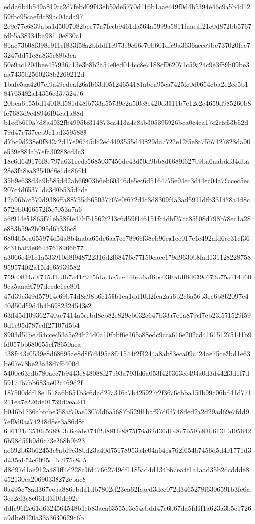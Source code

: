 {edda6b4b549a819cc2d7febd09f43eb59de5770d116b1aae449f0d4b5394e46c9a5b4d1259fbc95caefdc89ac04cda97
2e9e77c6839aba1d5007082bcc77a7fccb9461da564a5999a5811faaedf21c0d872bb5767fdb5a38334ba98110e830c1
81ac73b08f398e911cf833f58a2bfddf1e973e9c66c70b601dfc9a3636aeec9bc737020fec73247dd71e8a835e88b3ca
50e9ac1204bee457936713e3b8b2a54e0ed014cc8e7188cf962071c59a24c9e3f89b09be3aa7435b2560238b2269212d
1bafe5aa4207cf9a49edeaf26afb63d05124654181abea95ea7425fc0d0654cba2d2ee5b184765482a14356ed3732476
20bea6b55bd14018d581d48fb733a55739c2a5f0e8e420d3011b7e12e2c4659d985260b8fe7683d9c48946f94ca1a88d
b1edb600a7d8a4932fb4995bf314873ea413a4c8ab305395926bea0e4ea17e2cfe53b52d79d47c737ceb9c1bd3595889
d7bc9d238e0f842a2d17e96345dc2ed4493555d40829da7722e12f5e8a75b7127828da90e539e884ab7efa30288cd3c3
18c6d649176f8e797a631ccdc5685037456dc43d50d9bb8d6689f627b9ba6aabdd34dba28e3fa8ea82540d6e1da86f44
35b9e638d3a9b585dd2ab66903b6eb60346de5ec6d5164775e94ec3d44ec04a79ccec5ec207c4d65371dc3d0b535d7de
12a96b7c579d9386ffa88755cb65037707e0f672d4c3d8309f4a3ad5911dfb331478a4d8c5729b0466572f5e7053a7a6
a6f914e51865f71eb58f4e47bf51562f213c6d59f146151fc4dbf37cc85508d798b78ec1a28e883b59e2b095d6b336c8
6804b5da655974d54a8b4aaba65de6aa7ec78969f38eb96ea1ce017e1e492afd6cc31cf368c31bab3e66437618966b77
a3066e491c1a533910d8f948722316d2f68476c77150eace179d9630b8fad131128228758959574f62a15f4e65939582
759c0814a0f745d1cdb7a418945fdacbe5ae14bea6af6bc0310ddf8d639c673a75a1144609ca5aaa9f797decde1ec801
47d39e349d57914e69b74d8a98b6c156b1ea1dd10d2fea2aa6b2c6a56b3ec6b8b2097e440d50d59d4b4b6982324543e2
63ff45d109362740ae7414a5eebd8cb82e829cb032c647b33a7e1a879cf7cb23f571529f590d1e95d787edf27107d5b4
8903d51be754ccec53a5e24b24d0a10fbbf6e165a88edc9cca616e202ad416151275141b9fd057bb680655cf78650aea
438fc43c0539e8d68695ae8d8f7d495a8f71544f2f3244a8ab83eca09c424ae75ce2bd1e63be07e78be23a38d7f6400d
5400c63edb780ace7b9443e848088f27b93a793fd6a053f420363ce494a0d3d442f3d1f7d59174b7bb683ae02c469d2f
187500ddf18e1518a6b651b3c6dad27a316a7b425927f2f3676cbba154b99c06bd41d771211ea7e226de01739d9ea241
b046b1336abfcbe358af70ae03073d6a6687b529f1baf97d0d748ded2a2d29ad69e7fdd97ef9d0aa74248d8ee3a86d8f
6d6121d3510e5989d3e6e9dc374f2d881fc8875f76a62d36d1a8c7b59fc83b61310d056426b98d59b9d6c73e268b0b23
ae692b63b62453c9abf9e38bd23a40d75178953a4c04a64ea762f654b7456d5d401771d3d435ab54e6095df1d975e8d5
d8d97d1ae912a489ff4d228c9fd47662749df1185ad4d134bb7ea4f1a1aad35b2dcddde8452130ca20690338272ebac8
0a495c78ad367eeba886cbdd1db7802ef23ca62fcaed3dcc072d3465278f6306591b3fe6a3ec2ef3e8e061d3f10dc92e
ddfc96f2c61d6324564548b1cb83aea63555e3c54cbdd47c6b67da5fd6f1a623a3b5e1726a9dbe9120a33a3630629c6b
}

